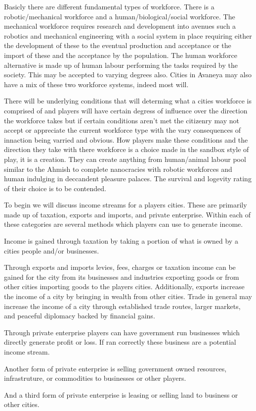 Basicly there are different fundamental types of workforce. There is a robotic/mechanical workforce and a human/biological/social workforce. The mechanical workforce requires research and development into avenues such a robotics and mechanical engineering with a social system in place requiring either the development of these to the eventual production and acceptance or the import of these and the acceptance by the population. The human workforce alternative is made up of human labour performing the tasks required by the society. This may be accepted to varying degrees also. Cities in Avaneya may also have a mix of these two workforce systems, indeed most will. 

There will be underlying conditions that will determing what a cities workforce is comprised of and players will have certain degress of influence over the direction the workforce takes but if certain conditions aren't met the citizenry may not accept or appreciate the current workforce type with the vary consequences of innaction being varried and obvious. How players make these conditions and the direction they take with there workforce is a choice made in the sandbox style of play, it is a creation. They can create anything from human/animal labour pool similar to the Ahmish to complete nanocracies with robotic workforces and human indulging in deccandent pleasure palaces. The survival and logevity rating of their choice is to be contended.



To begin we will discuss income streams for a players cities. These are primarily made up of taxation, exports and imports, and private enterprise. Within each of these categories are several methods which players can use to generate income.

Income is gained through taxation by taking a portion of what is owned by a cities people and/or businesses.

Through exports and imports levies, fees, charges or taxation income can be gained for the city from its businesses and industries exporting goods or from other cities importing goods to the players cities. Additionally, exports increase the income of a city by bringing in wealth from other cities. Trade in general may increase the income of a city through established trade routes, larger markets, and peaceful diplomacy backed by financial gains. 

Through private enterprise players can have government run businesses which directly generate profit or loss. If ran correctly these business are a potential income stream.

Another form of private enterprise is selling government owned resources, infrastruture, or commodities to businesses or other players.

And a third form of private enterprise is leasing or selling land to business or other cities.
